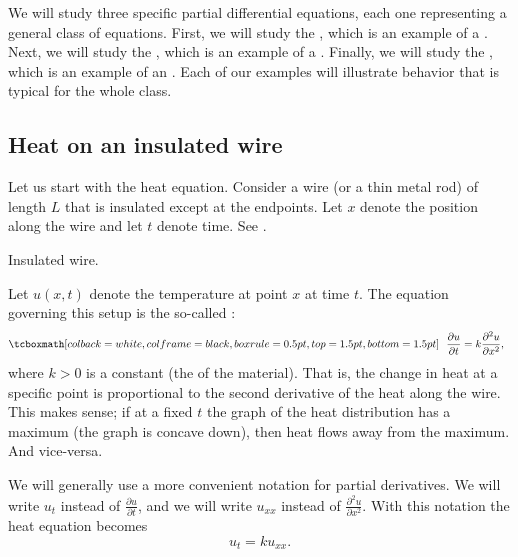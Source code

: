 We will study three specific
partial differential equations, each one representing a
general class of equations.  First, we will study the
\emph{}, which is an example of
a \emph{}.  Next, we will study the
\emph{}, which is an example of
a \emph{}.  Finally, we will study the
\emph{}, which is an example of
an \emph{}.  Each of our examples will illustrate
behavior that is typical for the whole class.

\subsection{Heat on an insulated wire}

Let us start with the heat equation.
Consider a wire (or a thin metal rod) of length $L$
that is insulated
except at the
endpoints.  Let $x$ denote the position along the wire and let $t$ denote
time.  See .

\begin{myfig}
\capstart
{}
\caption{Insulated wire.\label{heat:wirefig}}
\end{myfig}

Let $u(x,t)$ denote the temperature at point $x$ at time $t$.
The equation governing this setup is the
so-called \emph{}:
\begin{equation*}
\mybxbg{~~
\frac{\partial u}{\partial t} =
k \frac{\partial^2 u}{\partial x^2} ,
~~}
\end{equation*}
where $k > 0$ is a constant (the \emph{} of the material).
That is, the change in heat at a specific point is proportional to the second
derivative of the heat along the wire.  This makes sense;
if at a fixed $t$
the graph of the heat distribution has a maximum (the graph is concave down),
then heat flows away from the maximum.  And vice-versa.

We will generally use a more convenient notation for partial derivatives.
We will write $u_t$ instead of $\frac{\partial u}{\partial t}$,
and we will write $u_{xx}$ instead of $\frac{\partial^2 u}{\partial x^2}$.
With this notation the heat equation becomes
\begin{equation*}
u_t = k u_{xx} .
\end{equation*}

